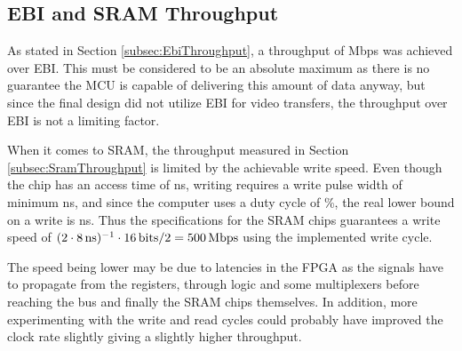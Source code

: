 \subsection{EBI and SRAM Throughput}
As stated in Section \ref{subsec:EbiThroughput}, a throughput of \unit[384]{Mbps} was achieved over EBI.
This must be considered to be an absolute maximum as there is no guarantee the MCU is capable of delivering this amount of data anyway, but since the final design did not utilize EBI for video transfers, the throughput over EBI is not a limiting factor.

When it comes to SRAM, the throughput measured in Section \ref{subsec:SramThroughput} is limited by the achievable write speed.
Even though the chip has an access time of \unit[10]{ns}, writing requires a write pulse width of minimum \unit[8]{ns}, and since the computer uses a duty cycle of \unit[50]{\%}, the real lower bound on a write is \unit[16]{ns}.
Thus the specifications for the SRAM chips guarantees a write speed of $(2\cdot\unit[8]{ns})^{-1} \cdot \unit[16]{bits} / 2 = \unit[500]{Mbps}$ using the implemented write cycle.

The speed being lower may be due to latencies in the FPGA as the signals have to propagate from the registers, through logic and some multiplexers before reaching the bus and finally the SRAM chips themselves. In addition, more experimenting with the write and read cycles could probably have improved the clock rate slightly giving a slightly higher throughput.

